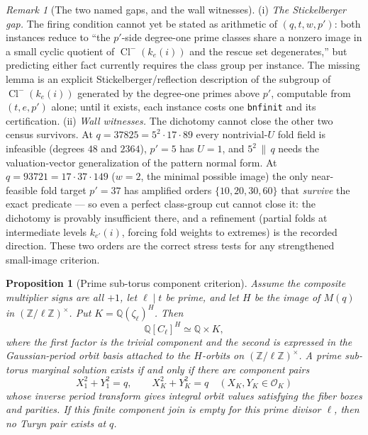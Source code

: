 \documentclass[11pt]{article}
\theoremstyle{plain}
\newtheorem{proposition}[theorem]{Proposition}
\theoremstyle{definition}
\theoremstyle{remark}
\newtheorem{remark}[theorem]{Remark}
\newcommand{\Z}{\mathbb Z}
\newcommand{\Q}{\mathbb Q}
\newcommand{\Cl}{\operatorname{Cl}}
\begin{document}
\begin{remark}[The two named gaps, and the wall witnesses]
\label{rem:fold-gaps}
(i) \emph{The Stickelberger gap.}  The firing condition cannot yet be
stated as arithmetic of $(q,t,w,p')$: both instances reduce to ``the
$p'$-side degree-one prime classes share a nonzero image in a small
cyclic quotient of $\Cl^-(k_e(i))$ and the rescue set degenerates,''
but predicting either fact currently requires the class group per
instance.  The missing lemma is an explicit Stickelberger/reflection
description of the subgroup of $\Cl^-(k_e(i))$ generated by the
degree-one primes above $p'$, computable from $(t,e,p')$ alone; until
it exists, each instance costs one \texttt{bnfinit} and its
certification.  (ii) \emph{Wall witnesses.}  The dichotomy cannot
close the other two census survivors.  At $q=37825=5^2\cdot17\cdot89$
every nontrivial-$U$ fold field is infeasible (degrees $48$ and
$2364$), $p'=5$ has $U=1$, and $5^2\,\|\,q$ needs the valuation-vector
generalization of the pattern normal form.  At
$q=93721=17\cdot37\cdot149$ ($w=2$, the minimal possible image) the
only near-feasible fold target $p'=37$ has amplified orders
$\{10,20,30,60\}$ that \emph{survive} the exact predicate --- so even
a perfect class-group cut cannot close it: the dichotomy is provably
insufficient there, and a refinement (partial folds at intermediate
levels $k_{e'}(i)$, forcing fold weights to extremes) is the recorded
direction.  These two orders are the correct stress tests for any
strengthened small-image criterion.
\end{remark}

\begin{proposition}[Prime sub-torus component criterion]\label{prop:prime-subtorus-component}
Assume the composite multiplier signs are all $+1$, let $\ell\mid t$ be prime,
and let $H$ be the image of $M(q)$ in $(\Z/\ell\Z)^\times$.  Put
$K=\Q(\zeta_\ell)^H$.  Then
\[
  \Q[C_\ell]^H\simeq \Q\times K,
\]
where the first factor is the trivial component and the second is expressed in
the Gaussian-period orbit basis attached to the $H$-orbits on
$(\Z/\ell\Z)^\times$.  A prime sub-torus marginal solution exists if and only if
there are component pairs
\[
  X_1^2+Y_1^2=q,\qquad X_K^2+Y_K^2=q\quad(X_K,Y_K\in\mathcal O_K)
\]
whose inverse period transform gives integral orbit values satisfying the
fiber boxes and parities.  If this finite component join is empty for this
prime divisor $\ell$, then no Turyn pair exists at $q$.
\end{proposition}
\end{document}
